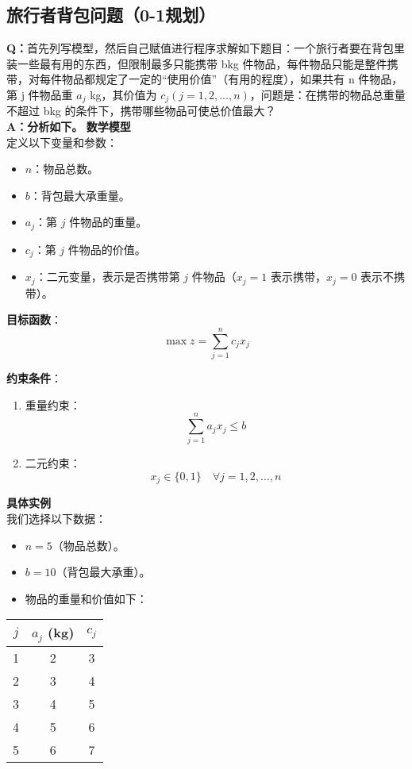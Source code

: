 \subsection{旅行者背包问题（0-1规划）}
\textbf{Q：}首先列写模型，然后自己赋值进行程序求解如下题目：一个旅行者要在背包里装一些最有用的东西，但限制最多只能携带 bkg 件物品，每件物品只能是整件携带，对每件物品都规定了一定的“使用价值”（有用的程度），如果共有 n 件物品，第 j 件物品重 $a_j$ kg，其价值为 $c_j (j=1,2,…,n)$，问题是：在携带的物品总重量不超过 bkg 的条件下，携带哪些物品可使总价值最大？
\\
\textbf{A：分析如下。}
\textbf{数学模型}\\
定义以下变量和参数：
\begin{itemize}
    \item \( n \)：物品总数。
    \item \( b \)：背包最大承重量。
    \item \( a_j \)：第 \( j \) 件物品的重量。
    \item \( c_j \)：第 \( j \) 件物品的价值。
    \item \( x_j \)：二元变量，表示是否携带第 \( j \) 件物品（\( x_j = 1 \) 表示携带，\( x_j = 0 \) 表示不携带）。
\end{itemize}

\textbf{目标函数}：
\[
\max z = \sum_{j=1}^n c_j x_j
\]

\textbf{约束条件}：
\begin{enumerate}
    \item 重量约束：
    \[
    \sum_{j=1}^n a_j x_j \leq b
    \]
    \item 二元约束：
    \[
    x_j \in \{0, 1\} \quad \forall j = 1, 2, \ldots, n
    \]
\end{enumerate}

\textbf{具体实例}\\
我们选择以下数据：
\begin{itemize}
    \item \( n = 5 \)（物品总数）。
    \item \( b = 10 \)（背包最大承重）。
    \item 物品的重量和价值如下：
\end{itemize}

\begin{center}
\begin{tabular}{|c|c|c|}
\hline
\( j \) & \( a_j \) (kg) & \( c_j \) \\
\hline
1 & 2 & 3 \\
2 & 3 & 4 \\
3 & 4 & 5 \\
4 & 5 & 6 \\
5 & 6 & 7 \\
\hline
\end{tabular}
\end{center}

